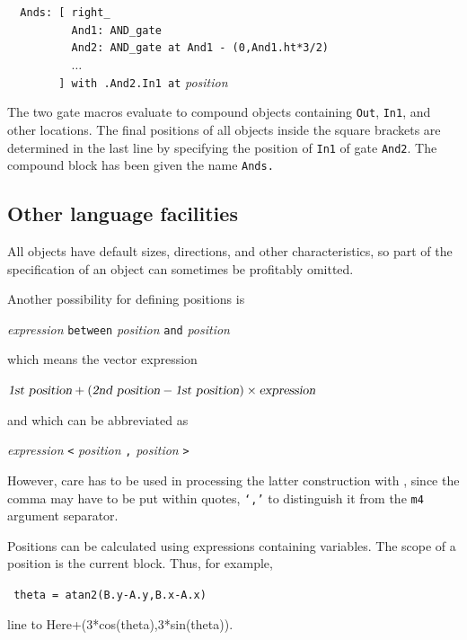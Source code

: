\noindent%
\verb|  Ands: [ right_|\\
\verb|          And1: AND_gate|\\
\verb|          And2: AND_gate at And1 - (0,And1.ht*3/2)|\\
\verb|          |$\ldots$\\
\verb|        ] with .And2.In1 at| {\sl position} %

The two gate macros evaluate to compound objects containing {\tt Out},
{\tt In1}, and other locations.  The final positions of all objects
inside the square brackets are determined in the last line by
specifying the position of {\tt In1} of gate {\tt And2}.
The compound block has been given the name {\tt Ands.}

\subsection{Other language facilities\label{Otherlanguage:}}

All objects have default sizes, directions, and other characteristics,
so part of the specification of an object can sometimes be profitably
omitted.

Another possibility for defining positions is 

{\sl expression} {\tt between} {\sl position}
 {\tt and} {\sl position}

\noindent%
which means the vector expression 


$\hbox{\sl 1st position} +
  (\hbox{\sl 2nd position} - \hbox{\sl 1st position}) \times
  \hbox{\sl expression} $

\noindent and which can be abbreviated as

{\sl expression} {\tt <} {\sl position} {\tt ,} {\sl position} {\tt >}

\noindent%
However,
care has to be used in processing the latter construction with \Mfour,
since the comma may have to be put within quotes, {\tt `,'}
to distinguish it from the {\tt m4} argument separator.

Positions can be calculated using expressions containing variables.
The scope of a position is the current block.  Thus, for example,

{\tt
  theta = atan2(B.y-A.y,B.x-A.x)

  line to Here+(3*cos(theta),3*sin(theta)).
  }

